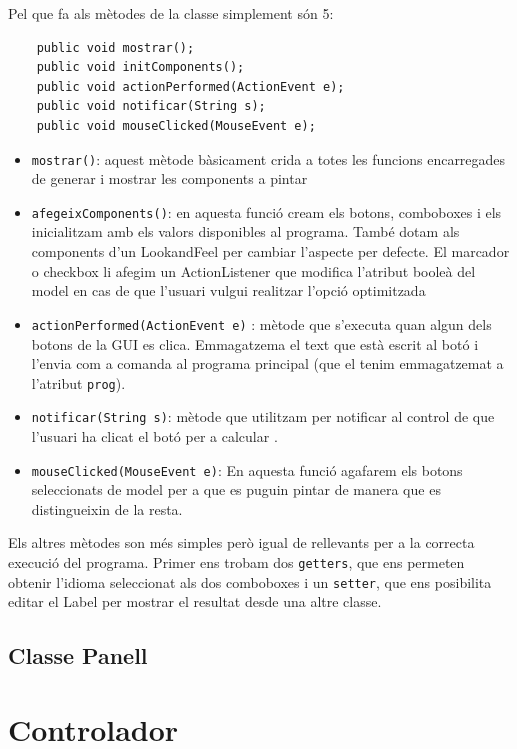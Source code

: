 \documentclass[conference]{IEEEtran}
\begin{document}
Pel que fa als mètodes de la classe simplement són 5:
\begin{verbatim}
    public void mostrar();
    public void initComponents();
    public void actionPerformed(ActionEvent e);
    public void notificar(String s);
    public void mouseClicked(MouseEvent e);
\end{verbatim}
\begin{itemize}
    \item \texttt{mostrar()}: aquest mètode bàsicament crida a totes les funcions encarregades de generar i mostrar les components a pintar\\
    \item \texttt{afegeixComponents()}: en aquesta funció cream els botons, comboboxes i els inicialitzam amb els valors disponibles al programa. També dotam als components d'un LookandFeel per cambiar l'aspecte per defecte. El marcador o checkbox li afegim un ActionListener que modifica l'atribut booleà del model en cas de que l'usuari vulgui realitzar l'opció optimitzada\\
    \item \texttt{actionPerformed(ActionEvent e)} : mètode que s'executa quan algun dels botons de la GUI es clica. Emmagatzema el text que està escrit al botó i l'envia com a comanda al programa principal (que el tenim emmagatzemat a l'atribut \texttt{prog}).\\
    \item \texttt{notificar(String s)}: mètode que utilitzam per notificar al control de que l'usuari ha clicat el botó per a calcular .\\
    \item  \texttt{mouseClicked(MouseEvent e)}: En aquesta funció agafarem els botons seleccionats de model per a que es puguin pintar de manera que es distingueixin de la resta.
\end{itemize}

Els altres mètodes son més simples però igual de rellevants per a la correcta execució del programa. Primer ens trobam dos \texttt{getters}, que ens permeten obtenir l'idioma seleccionat als dos comboboxes i un \texttt{setter}, que ens posibilita editar el Label per mostrar el resultat desde una altre classe.

\subsection{Classe Panell}

\section{Controlador}
\end{document}
